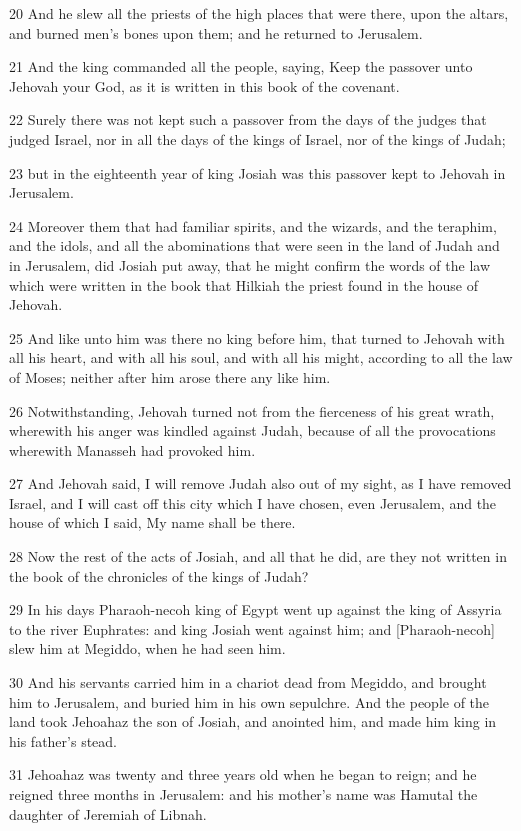 \par 20 And he slew all the priests of the high places that were there, upon the altars, and burned men's bones upon them; and he returned to Jerusalem.
\par 21 And the king commanded all the people, saying, Keep the passover unto Jehovah your God, as it is written in this book of the covenant.
\par 22 Surely there was not kept such a passover from the days of the judges that judged Israel, nor in all the days of the kings of Israel, nor of the kings of Judah;
\par 23 but in the eighteenth year of king Josiah was this passover kept to Jehovah in Jerusalem.
\par 24 Moreover them that had familiar spirits, and the wizards, and the teraphim, and the idols, and all the abominations that were seen in the land of Judah and in Jerusalem, did Josiah put away, that he might confirm the words of the law which were written in the book that Hilkiah the priest found in the house of Jehovah.
\par 25 And like unto him was there no king before him, that turned to Jehovah with all his heart, and with all his soul, and with all his might, according to all the law of Moses; neither after him arose there any like him.
\par 26 Notwithstanding, Jehovah turned not from the fierceness of his great wrath, wherewith his anger was kindled against Judah, because of all the provocations wherewith Manasseh had provoked him.
\par 27 And Jehovah said, I will remove Judah also out of my sight, as I have removed Israel, and I will cast off this city which I have chosen, even Jerusalem, and the house of which I said, My name shall be there.
\par 28 Now the rest of the acts of Josiah, and all that he did, are they not written in the book of the chronicles of the kings of Judah?
\par 29 In his days Pharaoh-necoh king of Egypt went up against the king of Assyria to the river Euphrates: and king Josiah went against him; and [Pharaoh-necoh] slew him at Megiddo, when he had seen him.
\par 30 And his servants carried him in a chariot dead from Megiddo, and brought him to Jerusalem, and buried him in his own sepulchre. And the people of the land took Jehoahaz the son of Josiah, and anointed him, and made him king in his father's stead.
\par 31 Jehoahaz was twenty and three years old when he began to reign; and he reigned three months in Jerusalem: and his mother's name was Hamutal the daughter of Jeremiah of Libnah.
